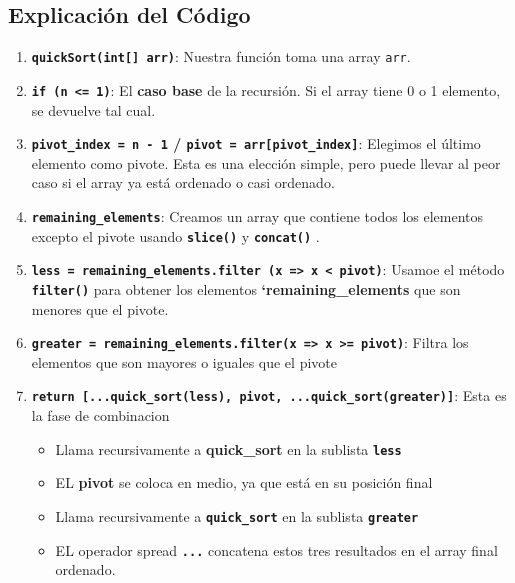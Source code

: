 \documentclass[
  spanish,
  letterpaper,
  DIV=11,
  numbers=noendperiod]{scrreprt}
\providecommand{\tightlist}{%
  \setlength{\itemsep}{0pt}\setlength{\parskip}{0pt}}
\begin{document}
\subsection{Explicación del
Código}\label{explicaciuxf3n-del-cuxf3digo-2}

\begin{enumerate}
\def\labelenumi{\arabic{enumi}.}
\tightlist
\item
  \textbf{\texttt{quickSort(int{[}{]}\ arr)}}: Nuestra función toma una
  array \texttt{arr}.
\item
  \textbf{\texttt{if\ (n\ \textless{}=\ 1)}}: El \textbf{caso base} de
  la recursión. Si el array tiene 0 o 1 elemento, se devuelve tal cual.
\item
  \textbf{\texttt{pivot\_index\ =\ n\ -\ 1} /
  \texttt{pivot\ =\ arr{[}pivot\_index{]}}}: Elegimos el último elemento
  como pivote. Esta es una elección simple, pero puede llevar al peor
  caso si el array ya está ordenado o casi ordenado.
\item
  \textbf{\texttt{remaining\_elements}}: Creamos un array que contiene
  todos los elementos excepto el pivote usando \textbf{\texttt{slice()}}
  y \textbf{\texttt{concat()}} .
\item
  \textbf{\texttt{less\ =\ remaining\_elements.filter\ (x\ =\textgreater{}\ x\ \textless{}\ pivot)}}:
  Usamoe el método \textbf{\texttt{filter()}} para obtener los elementos
  \textbf{`remaining\_elements} que son menores que el pivote.
\item
  \textbf{\texttt{greater\ =\ remaining\_elements.filter(x\ =\textgreater{}\ x\ \textgreater{}=\ pivot)}}:
  Filtra los elementos que son mayores o iguales que el pivote
\item
  \textbf{\texttt{return\ {[}...quick\_sort(less),\ pivot,\ ...quick\_sort(greater){]}}}:
  Esta es la fase de combinacion

  \begin{itemize}
  \tightlist
  \item
    Llama recursivamente a \textbf{quick\_sort} en la sublista
    \textbf{\texttt{less}}
  \item
    EL \textbf{pivot} se coloca en medio, ya que está en su posición
    final
  \item
    Llama recursivamente a \textbf{\texttt{quick\_sort}} en la sublista
    \textbf{\texttt{greater}}
  \item
    EL operador spread \textbf{\texttt{...}} concatena estos tres
    resultados en el array final ordenado.
  \end{itemize}
\end{enumerate}
\end{document}
